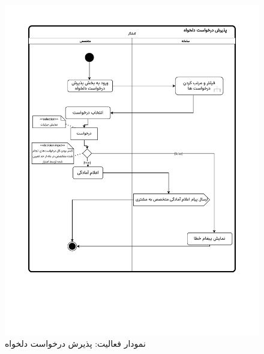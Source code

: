 \begin{figure}[ht!]
	\centering
	\includegraphics[scale=0.8]{figs/OOD-activity-14.pdf}
	\caption{نمودار فعالیت: پذیرش درخواست دلخواه}
\end{figure}
\FloatBarrier
\newpage

